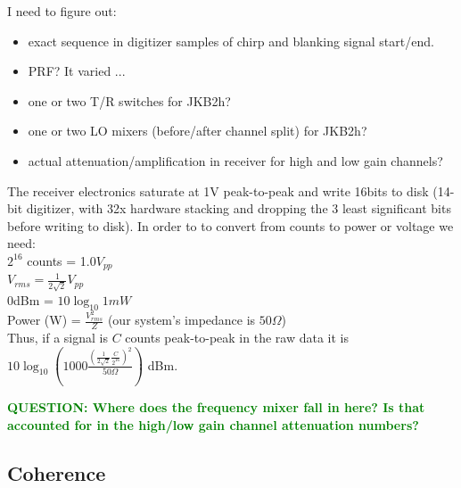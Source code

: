 \documentclass[11pt]{article}
\newcommand{\question}[1]{\ifthenelse{\boolean{include-questions}} {\textcolor{Green}{\textbf{QUESTION: #1}}}{}}
\begin{document}
I need to figure out:
\begin{itemize}
\item exact sequence in digitizer samples of chirp and blanking signal start/end.
\item PRF? It varied ...
\item one or two T/R switches for JKB2h?
\item one or two LO mixers (before/after channel split) for JKB2h?
\item actual attenuation/amplification in receiver for high and low gain channels?
\end{itemize}

The receiver electronics saturate at 1V peak-to-peak and write 16bits to disk (14-bit digitizer, with 32x hardware stacking and dropping the 3 least significant bits before writing to disk).
In order to to convert from counts to power or voltage we need: \\
$2^{16}$ counts = 1.0$V_{pp}$ \\
$V_{rms} = \frac{1}{2\sqrt{2}}V_{pp}$ \\
0dBm = $10 \log_{10} 1mW$ \\
Power (W) = $\frac{V_{rms}^2}{Z}$  (our system's impedance is $50\Omega$) \\

Thus, if a signal is $C$ counts peak-to-peak in the raw data it is
$10 \log_{10} \left(1000\frac{\left(\frac{1}{2\sqrt2}\frac{C}{2^{16}}\right)^2}{50\Omega}\right)$ dBm.


\question{Where does the frequency mixer fall in here? Is that accounted for in the high/low gain channel attenuation numbers? }

\subsection{Coherence}
\end{document}
